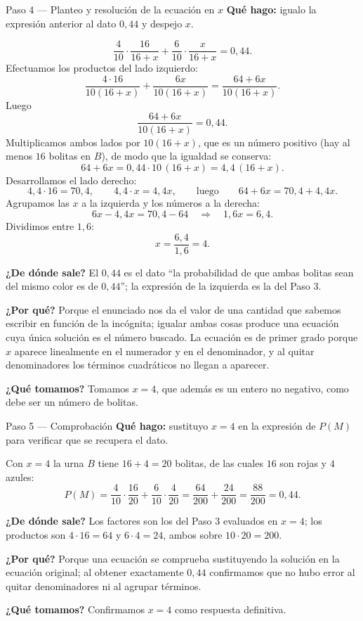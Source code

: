 \documentclass[11pt]{article}
\begin{document}
\begin{paso}{Paso 4 --- Planteo y resolución de la ecuación en $x$}
\textbf{Qué hago:} igualo la expresión anterior al dato $0{,}44$ y despejo $x$.

\[
\frac{4}{10}\cdot\frac{16}{16+x}+\frac{6}{10}\cdot\frac{x}{16+x}=0{,}44 .
\]
Efectuamos los productos del lado izquierdo:
\[
\frac{4\cdot 16}{10(16+x)}+\frac{6x}{10(16+x)}=\frac{64+6x}{10(16+x)} .
\]
Luego
\[
\frac{64+6x}{10(16+x)}=0{,}44 .
\]
Multiplicamos ambos lados por $10(16+x)$, que es un número positivo (hay al menos $16$ bolitas en $B$), de modo que la igualdad se conserva:
\[
64+6x=0{,}44\cdot 10\,(16+x)=4{,}4\,(16+x).
\]
Desarrollamos el lado derecho:
\[
4{,}4\cdot 16=70{,}4,
\qquad
4{,}4\cdot x=4{,}4x,
\qquad\text{luego}\qquad
64+6x=70{,}4+4{,}4x .
\]
Agrupamos las $x$ a la izquierda y los números a la derecha:
\[
6x-4{,}4x=70{,}4-64
\quad\Longrightarrow\quad
1{,}6x=6{,}4 .
\]
Dividimos entre $1{,}6$:
\[
x=\frac{6{,}4}{1{,}6}=4 .
\]

\textbf{¿De dónde sale?} El $0{,}44$ es el dato ``la probabilidad de que ambas bolitas sean del mismo color es de $0{,}44$''; la expresión de la izquierda es la del Paso 3.

\textbf{¿Por qué?} Porque el enunciado nos da el valor de una cantidad que sabemos escribir en función de la incógnita; igualar ambas cosas produce una ecuación cuya única solución es el número buscado. La ecuación es de primer grado porque $x$ aparece linealmente en el numerador y en el denominador, y al quitar denominadores los términos cuadráticos no llegan a aparecer.

\textbf{¿Qué tomamos?} Tomamos $x=4$, que además es un entero no negativo, como debe ser un número de bolitas.
\end{paso}

\begin{paso}{Paso 5 --- Comprobación}
\textbf{Qué hago:} sustituyo $x=4$ en la expresión de $P(M)$ para verificar que se recupera el dato.

Con $x=4$ la urna $B$ tiene $16+4=20$ bolitas, de las cuales $16$ son rojas y $4$ azules:
\[
P(M)=\frac{4}{10}\cdot\frac{16}{20}+\frac{6}{10}\cdot\frac{4}{20}
=\frac{64}{200}+\frac{24}{200}
=\frac{88}{200}
=0{,}44 .
\]

\textbf{¿De dónde sale?} Los factores son los del Paso 3 evaluados en $x=4$; los productos son $4\cdot 16=64$ y $6\cdot 4=24$, ambos sobre $10\cdot 20=200$.

\textbf{¿Por qué?} Porque una ecuación se comprueba sustituyendo la solución en la ecuación original; al obtener exactamente $0{,}44$ confirmamos que no hubo error al quitar denominadores ni al agrupar términos.

\textbf{¿Qué tomamos?} Confirmamos $x=4$ como respuesta definitiva.
\end{paso}
\end{document}
